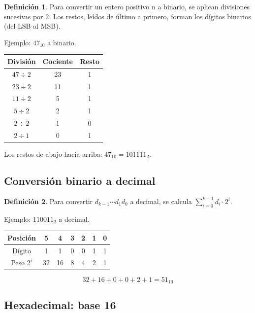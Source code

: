 \documentclass[10pt,a4paper]{article}
\theoremstyle{definition}
\newtheorem{definicion}{Definición}[section]
\begin{document}
\begin{definicion}
    Para convertir un entero positivo n a binario, se aplican divisiones
    sucesivas por 2. Los restos, leídos de último a primero, forman los dígitos
    binarios (del LSB al MSB).
\end{definicion}

Ejemplo: $47_{10}$ a binario.

\begin{center}
\begin{tabular}{c|c|c}
    \toprule
    División & Cociente & Resto \\
    \midrule
    $47 \div 2$ & 23 & 1 \\
    $23 \div 2$ & 11 & 1 \\
    $11 \div 2$ & 5 & 1 \\
    $5 \div 2$ & 2 & 1 \\
    $2 \div 2$ & 1 & 0 \\
    $2 \div 1$ & 0 & 1 \\
    \bottomrule
\end{tabular}
\end{center}

Los restos de abajo hacia arriba: $47_{10} = 101111_{2}$.

\subsection{Conversión binario a decimal}

\begin{definicion}
    Para convertir $d_{k-1} \cdots d_1 d_0$ a decimal, se calcula
    $\sum_{i=0}^{k-1} d_i \cdot 2^i$.
\end{definicion}

Ejemplo: $110011_{2}$ a decimal.

\begin{center}
    \begin{tabular}{c|cccccc}
        \toprule
        Posición & 5 & 4 & 3 & 2 & 1 & 0 \\
        \midrule
        Dígito & 1 & 1 & 0 & 0 & 1 & 1 \\
        Peso $2^i$ & 32 & 16 & 8 & 4 & 2 & 1 \\
        \bottomrule
    \end{tabular}
\end{center}

\[
    32 + 16 + 0 + 0 + 2 + 1 = 51_{10}
\]
\subsection{Hexadecimal: base 16}
\end{document}
